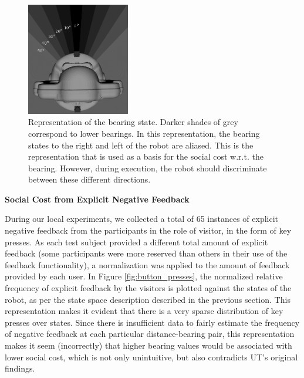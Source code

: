 \documentclass[a4paper,11pt]{report}
\begin{document}
\begin{figure}
    \centering
    \includegraphics[width=0.4\textwidth]{figures/state_viz.png}
    \caption{Representation of the bearing state. Darker shades of grey correspond to lower bearings. In this representation, the bearing states to the right and left of the robot are aliased. This is the representation that is used as a basis for the social cost w.r.t. the bearing. However, during execution, the robot should discriminate between these different directions.}
    	\label{fig:state_viz}
\end{figure}

{\bf Social Cost from Explicit Negative Feedback}

During our local experiments, we collected a total of 65 instances of explicit negative feedback from the participants in the role of visitor, in the form of key presses. As each test subject provided a different total amount of explicit feedback (some participants were more reserved than others in their use of the feedback functionality), a normalization was applied to the amount of feedback provided by each user. In Figure \ref{fig:button_presses}, the normalized relative frequency of explicit feedback by the visitors is plotted against the states of the robot, as per the state space description described in the previous section. This representation makes it evident that there is a very sparse distribution of key presses over states. Since there is insufficient data to fairly estimate the frequency of negative feedback at each particular distance-bearing pair, this representation makes it seem (incorrectly) that higher bearing values would be associated with lower social cost, which is not only unintuitive, but also contradicts UT's original findings.

\end{document}
